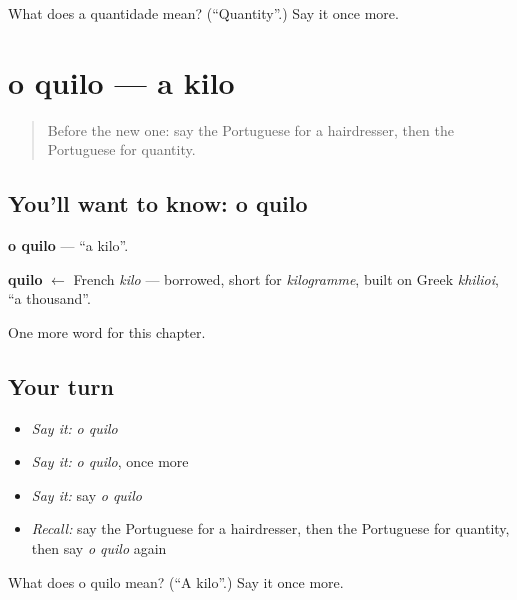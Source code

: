 \begin{tcolorbox}[breakable,colback=teal!4,colframe=teal!35!black,title={Before you move on}]
What does a quantidade mean? (\textquotedblleft{}Quantity\textquotedblright{}.) Say it once more.
\end{tcolorbox}
\section[o quilo]{o quilo — a kilo}

\label{lesson:PT-C198-quilo}



\begin{quote}
Before the new one: say the Portuguese for a hairdresser, then the Portuguese for quantity.
\end{quote}

\subsection*{You'll want to know: o quilo}
\textbf{o quilo} — \textquotedblleft{}a kilo\textquotedblright{}.

\begin{cousinweb}
\textbf{quilo} $\leftarrow$ French \emph{kilo} — borrowed, short for \emph{kilogramme}, built on Greek \emph{khilioi}, \textquotedblleft{}a thousand\textquotedblright{}.
\end{cousinweb}

\begin{grammarlens}[title={What you've built}]
One more word for this chapter.
\end{grammarlens}

\subsection*{Your turn}
\begin{itemize}
\raggedright
  \item \emph{Say it:} \emph{o quilo}
  \item \emph{Say it:} \emph{o quilo}, once more
  \item \emph{Say it:} say \emph{o quilo}
  \item \emph{Recall:} say the Portuguese for a hairdresser, then the Portuguese for quantity, then say \emph{o quilo} again
\end{itemize}

\begin{tcolorbox}[breakable,colback=teal!4,colframe=teal!35!black,title={Before you move on}]
What does o quilo mean? (\textquotedblleft{}A kilo\textquotedblright{}.) Say it once more.
\end{tcolorbox}
